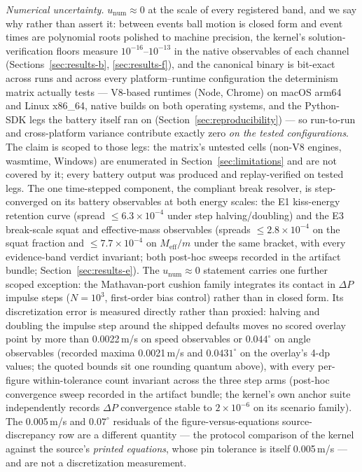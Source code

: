 \emph{Numerical uncertainty.} $u_{\mathrm{num}} \approx 0$ at the scale of
every registered band, and we say why rather than assert it: between
events ball motion is closed form and event times are polynomial roots
polished to machine precision, the kernel's solution-verification floors
measure $10^{-16}$--$10^{-13}$ in the native observables of each channel
(Sections~\ref{sec:results-b}, \ref{sec:results-f}), and the canonical
binary is bit-exact across runs and across every platform--runtime
configuration the determinism matrix actually tests --- V8-based
runtimes (Node, Chrome) on macOS arm64 and Linux x86\_64, native builds
on both operating systems, and the Python-SDK legs the battery itself
ran on (Section~\ref{sec:reproducibility}) --- so run-to-run and
cross-platform variance contribute exactly zero \emph{on the tested
configurations}. The claim is scoped to those legs: the matrix's
untested cells (non-V8 engines, wasmtime, Windows) are enumerated in
Section~\ref{sec:limitations} and are not covered by it; every battery
output was produced and replay-verified on tested legs. The one
time-stepped component, the compliant break resolver, is step-converged
on its battery observables at both energy scales: the E1 kiss-energy
retention curve (spread $\leq 6.3\times10^{-4}$ under step
halving/doubling) and the E3 break-scale squat and effective-mass
observables (spreads $\leq 2.8\times10^{-4}$ on the squat fraction and
$\leq 7.7\times10^{-4}$ on $M_{\mathrm{eff}}/m$ under the same bracket,
with every evidence-band verdict invariant; both post-hoc sweeps
recorded in the artifact bundle; Section~\ref{sec:results-e}). The
$u_{\mathrm{num}} \approx 0$ statement carries one further scoped
exception: the Mathavan-port cushion family integrates its contact in
$\Delta P$ impulse steps ($N = 10^3$, first-order bias control) rather
than in closed form. Its discretization error is measured directly
rather than proxied: halving and doubling the impulse step around the
shipped defaults moves no scored overlay point by more than
0.0022\,m/s on speed observables or $0.044^\circ$ on angle observables
(recorded maxima 0.0021\,m/s and $0.0431^\circ$ on the overlay's 4-dp
values; the quoted bounds sit one rounding quantum above),
with every per-figure within-tolerance count invariant across the three
step arms (post-hoc convergence sweep recorded in the artifact bundle;
the kernel's own anchor suite independently records $\Delta P$
convergence stable to $2\times10^{-6}$ on its scenario family). The
0.005\,m/s and $0.07^\circ$ residuals of the figure-versus-equations
source-discrepancy row are a different quantity --- the protocol
comparison of the kernel
against the source's \emph{printed equations}, whose pin tolerance is
itself 0.005\,m/s --- and are not a discretization measurement.

